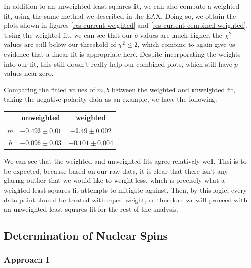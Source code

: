 \documentclass[10pt]{article}
\begin{document}
	In addition to an unweighted least-squares fit, we can also compute a weighted
	fit, using the same method we described in the EAX. Doing so, we obtain the plots
	shown in figures \ref{res-current-weighted} and
	\ref{res-current-combined-weighted}. Using the weighted fit, we can see that our
	\( p \)-values are much higher, the \( \chi^2 \) values are still below our
	threshold of \( \chi^2 \leq 2 \), which combine to again give us evidence that
	a linear fit is appropriate here. Despite incorporating the weights into our fit,
	this still doesn't really help our combined plots, which still have \( p
	\)-values near zero.  

	Comparing the fitted values of \( m, b \) between the weighted and unweighted
	fit, taking the negative polarity data  as an example, we have the
	following:
	\begin{center}
		\begin{tabular}{c|cc}
				& unweighted      & weighted        \\ \hline
			\( m \) & \( -0.493 \pm 0.01\) & \( -0.49 \pm 0.002\) \\
			\( b \) & \( -0.095 \pm 0.03\) & \( -0.101\pm 0.004\)
		\end{tabular}
	\end{center}
	We can see that the weighted and unweighted fits agree relatively well. Thsi is
	to be expected, because based on our raw data, it is clear that there isn't any
	glaring outlier that we would like to weight less, which is precisely what a
	weighted least-squares fit attempts to mitigate against. Then, by this logic,
	every data point should be treated with equal weight, so therefore we will
	proceed with an unweighted least-squares fit for the rest of the analysis.   

	\subsection{Determination of Nuclear Spins}
	\subsubsection{Approach I}
\end{document}
